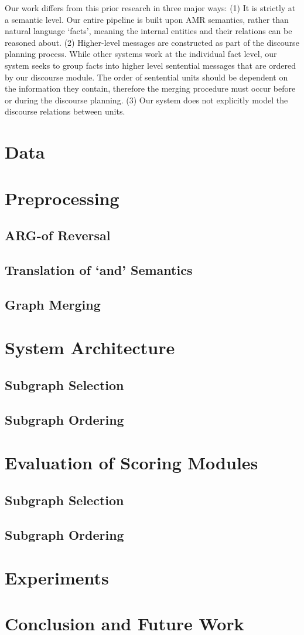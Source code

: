\documentclass[12pt]{article}
\begin{document}
Our work differs from this prior research in three major ways: (1) It is strictly at a semantic level. Our entire pipeline is built upon AMR semantics, rather than natural language `facts', meaning the internal entities and their relations can be reasoned about. (2) Higher-level messages are constructed as part of the discourse planning process. While other systems work at the individual fact level, our system seeks to group facts into higher level sentential messages that are ordered by our discourse module. The order of sentential units should be dependent on the information they contain, therefore the merging procedure must occur before or during the discourse planning. (3) Our system does not explicitly model the discourse relations between units.

\section{Data}

\section{Preprocessing}
\subsection{ARG-of Reversal}
\subsection{Translation of `and' Semantics}
\subsection{Graph Merging}

\section{System Architecture}
\subsection{Subgraph Selection}
\subsection{Subgraph Ordering}

\section{Evaluation of Scoring Modules}
\subsection{Subgraph Selection}
\subsection{Subgraph Ordering}

\section{Experiments}

\section{Conclusion and Future Work}

\pagebreak


\end{document}
